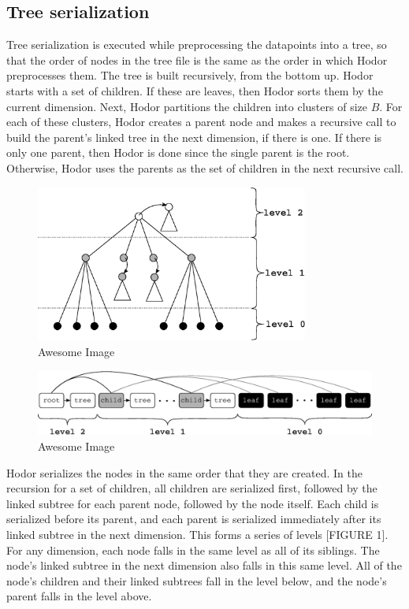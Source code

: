 \documentclass[11pt, oneside]{article}
\begin{document}
\subsection{Tree serialization}


Tree serialization is executed while preprocessing the datapoints into a tree,
so that the order of nodes in the tree file is the same as the order in which
Hodor preprocesses them. The tree is built recursively, from the bottom up.
Hodor starts with a set of children. If these are leaves, then Hodor sorts them
by the current dimension. Next, Hodor partitions the children into clusters of
size $B$. For each of these clusters, Hodor creates a parent node and makes a
recursive call to build the parent's linked tree in the next dimension, if
there is one. If there is only one parent, then Hodor is done since the single
parent is the root.  Otherwise, Hodor uses the parents as the set of children
in the next recursive call. 

\begin{figure}[p]
    \centering
    \includegraphics[width=0.8\textwidth]{fig1.eps}
    \caption{Awesome Image}
\end{figure}
\begin{figure}[p]
    \centering
    \includegraphics[width=1\textwidth]{fig2.eps}
    \caption{Awesome Image}
\end{figure}

Hodor serializes the nodes in the same order that they are created. In the
recursion for a set of children, all children are serialized first, followed by
the linked subtree for each parent node, followed by the node itself. Each
child is serialized before its parent, and each parent is serialized
immediately after its linked subtree in the next dimension. This forms a series
of levels [FIGURE 1]. For any dimension, each node falls in the same level as
all of its siblings. The node's linked subtree in the next dimension also falls
in this same level. All of the node's children and their linked subtrees fall
in the level below, and the node's parent falls in the level above. 
\end{document}
